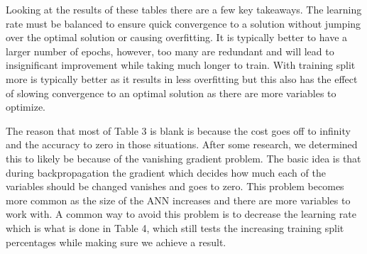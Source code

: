 \documentclass[12pt]{article}
\begin{document}
\begin{table}[h]
\centering
\caption{Sensitivity Analysis III \newline{} Parameters of , , }
\end{table}

Looking at the results of these tables there are a few key takeaways. The learning rate must be balanced to ensure quick convergence to a solution without jumping over the optimal solution or causing overfitting. It is typically better to have a larger number of epochs, however, too many are redundant and will lead to insignificant improvement while taking much longer to train. With training split more is typically better as it results in less overfitting but this also has the effect of slowing convergence to an optimal solution as there are more variables to optimize.

The reason that most of Table 3 is blank is because the cost goes off to infinity and the accuracy to zero in those situations. After some research, we determined this to likely be because of the vanishing gradient problem. The basic idea is that during backpropagation the gradient which decides how much each of the variables should be changed vanishes and goes to zero. This problem becomes more common as the size of the ANN increases and there are more variables to work with. A common way to avoid this problem is to decrease the learning rate which is what is done in Table 4, which still tests the increasing training split percentages while making sure we achieve a result.
\end{document}
